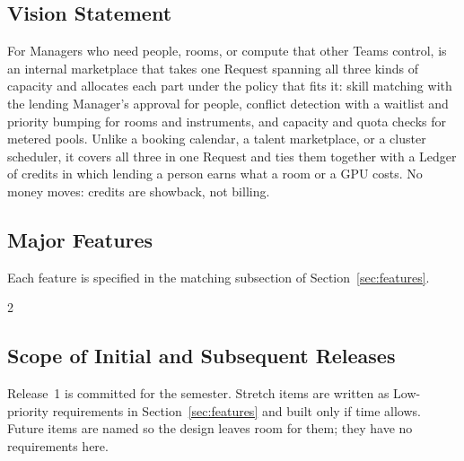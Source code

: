 \subsection{Vision Statement}

For Managers who need people, rooms, or compute that other Teams control, \SRSproduct{} is an internal marketplace that takes one Request spanning all three kinds of capacity and allocates each part under the policy that fits it: skill matching with the lending Manager's approval for people, conflict detection with a waitlist and priority bumping for rooms and instruments, and capacity and quota checks for metered pools. Unlike a booking calendar, a talent marketplace, or a cluster scheduler, it covers all three in one Request and ties them together with a Ledger of credits in which lending a person earns what a room or a GPU costs. No money moves: credits are showback, not billing.

\subsection{Major Features}

Each feature is specified in the matching subsection of Section~\ref{sec:features}.

\begin{multicols}{2}
\end{multicols}

\subsection{Scope of Initial and Subsequent Releases}

Release~1 is committed for the semester. Stretch items are written as Low-priority requirements in Section~\ref{sec:features} and built only if time allows. Future items are named so the design leaves room for them; they have no requirements here.

